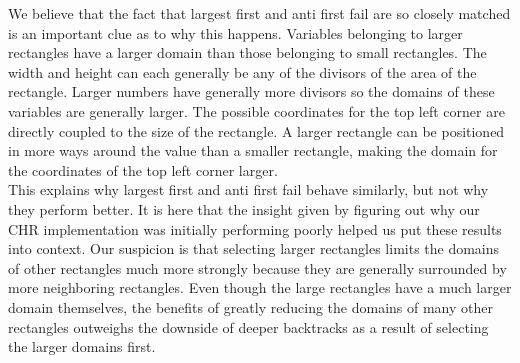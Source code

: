 We believe that the fact that largest first and anti first fail are so closely matched is an important clue as to why this happens. Variables belonging to larger rectangles have a larger domain than those belonging to small rectangles. The width and height can each generally be any of the divisors of the area of the rectangle. Larger numbers have generally more divisors so the domains of these variables are generally larger. The possible coordinates for the top left corner are directly coupled to the size of the rectangle. A larger rectangle can be positioned in more ways around the value than a smaller rectangle, making the domain for the coordinates of the top left corner larger.\\

This explains why largest first and anti first fail behave similarly, but not why they perform better. It is here that the insight given by figuring out why our CHR implementation was initially performing poorly helped us put these results into context. Our suspicion is that selecting larger rectangles limits the domains of other rectangles much more strongly because they are generally surrounded by more neighboring rectangles. Even though the large rectangles have a much larger domain themselves, the benefits of greatly reducing the domains of many other rectangles outweighs the downside of deeper backtracks as a result of selecting the larger domains first.

